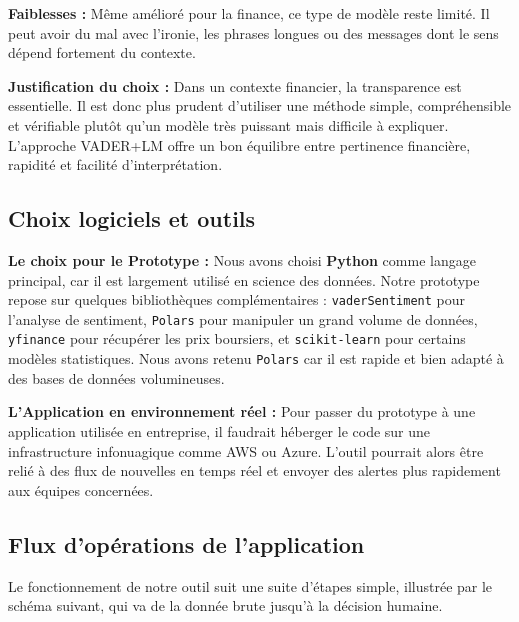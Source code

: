 \documentclass[11pt,a4paper]{article}
\begin{document}
\textbf{Faiblesses :}
Même amélioré pour la finance, ce type de modèle reste limité. Il peut avoir du mal avec l'ironie, les phrases longues ou des messages dont le sens dépend fortement du contexte.

\textbf{Justification du choix :} 
Dans un contexte financier, la transparence est essentielle. Il est donc plus prudent d'utiliser une méthode simple, compréhensible et vérifiable plutôt qu'un modèle très puissant mais difficile à expliquer. L'approche VADER+LM offre un bon équilibre entre pertinence financière, rapidité et facilité d'interprétation.

\subsection{Choix logiciels et outils}
\textbf{Le choix pour le Prototype :} 
Nous avons choisi \textbf{Python} comme langage principal, car il est largement utilisé en science des données. Notre prototype repose sur quelques bibliothèques complémentaires : \texttt{vaderSentiment} pour l'analyse de sentiment, \texttt{Polars} pour manipuler un grand volume de données, \texttt{yfinance} pour récupérer les prix boursiers, et \texttt{scikit-learn} pour certains modèles statistiques. Nous avons retenu \texttt{Polars} car il est rapide et bien adapté à des bases de données volumineuses.

\textbf{L'Application en environnement réel :} 
Pour passer du prototype à une application utilisée en entreprise, il faudrait héberger le code sur une infrastructure infonuagique comme AWS ou Azure. L'outil pourrait alors être relié à des flux de nouvelles en temps réel et envoyer des alertes plus rapidement aux équipes concernées.

\subsection{Flux d'opérations de l'application}
Le fonctionnement de notre outil suit une suite d'étapes simple, illustrée par le schéma suivant, qui va de la donnée brute jusqu'à la décision humaine.
\end{document}
